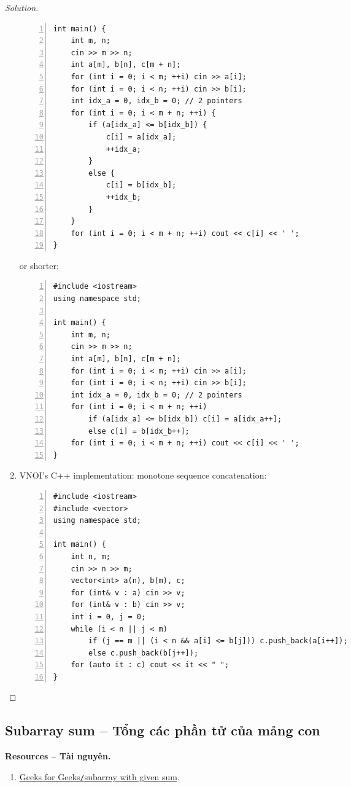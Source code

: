 \documentclass{article}
\begin{document}
\begin{proof}[Solution]
\begin{enumerate}
\begin{Verbatim}[numbers=left,xleftmargin=5mm]
int main() {
    int m, n;
    cin >> m >> n;
    int a[m], b[n], c[m + n];
    for (int i = 0; i < m; ++i) cin >> a[i];
    for (int i = 0; i < n; ++i) cin >> b[i];
    int idx_a = 0, idx_b = 0; // 2 pointers
    for (int i = 0; i < m + n; ++i) {
        if (a[idx_a] <= b[idx_b]) {
            c[i] = a[idx_a];
            ++idx_a;
        }
        else {
            c[i] = b[idx_b];
            ++idx_b;
        }
    }
    for (int i = 0; i < m + n; ++i) cout << c[i] << ' ';
}
        \end{Verbatim}
        or shorter:
        \begin{Verbatim}[numbers=left,xleftmargin=5mm]
#include <iostream>
using namespace std;

int main() {
    int m, n;
    cin >> m >> n;
    int a[m], b[n], c[m + n];
    for (int i = 0; i < m; ++i) cin >> a[i];
    for (int i = 0; i < n; ++i) cin >> b[i];
    int idx_a = 0, idx_b = 0; // 2 pointers
    for (int i = 0; i < m + n; ++i)
        if (a[idx_a] <= b[idx_b]) c[i] = a[idx_a++];
        else c[i] = b[idx_b++];
    for (int i = 0; i < m + n; ++i) cout << c[i] << ' ';
}
        \end{Verbatim}
        \item VNOI's C++ implementation: monotone sequence concatenation:
        \begin{Verbatim}[numbers=left,xleftmargin=5mm]
#include <iostream>
#include <vector>
using namespace std;

int main() {
    int n, m;
    cin >> n >> m;
    vector<int> a(n), b(m), c;
    for (int& v : a) cin >> v;
    for (int& v : b) cin >> v;
    int i = 0, j = 0;
    while (i < n || j < m)
        if (j == m || (i < n && a[i] <= b[j])) c.push_back(a[i++]);
        else c.push_back(b[j++]);
    for (auto it : c) cout << it << " ";
}
        \end{Verbatim}
    \end{enumerate}
\end{proof}


\subsection{Subarray sum -- Tổng các phần tử của mảng con}
\textbf{\textsf{Resources -- Tài nguyên.}}
\begin{enumerate}
    \item \href{https://www.geeksforgeeks.org/dsa/find-subarray-with-given-sum/}{Geeks for Geeks{\tt/}subarray with given sum}.
\end{enumerate}
\end{document}
